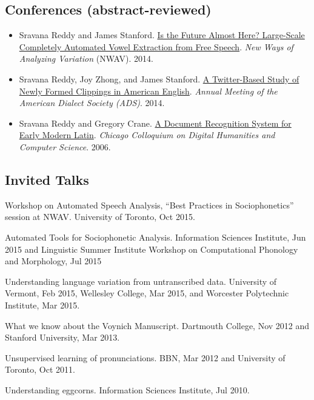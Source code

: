 \documentclass[10.5pt,letterpaper]{article}
\begin{document}
%
%
%

\subsection*{Conferences (abstract-reviewed)}

\begin{itemize}
\item Sravana Reddy and James Stanford. \ul{Is the Future Almost Here? Large-Scale Completely Automated Vowel Extraction from Free Speech}. {\em New Ways of Analyzing Variation} (NWAV). 2014. 

\item Sravana Reddy, Joy Zhong, and James Stanford. \ul{A Twitter-Based Study of Newly Formed Clippings in American English}. {\em Annual Meeting of the American Dialect Society (ADS)}. 2014.

\item Sravana Reddy and Gregory Crane. \ul{A Document Recognition System for Early Modern Latin}. {\em Chicago Colloquium on Digital Humanities and Computer Science}. 2006.

\end{itemize}

\subsection*{Invited Talks}

\begin{itemize*}
\item Workshop on Automated Speech Analysis, ``Best Practices in Sociophonetics'' session at NWAV. University of Toronto, Oct 2015.
\item Automated Tools for Sociophonetic Analysis. Information Sciences Institute, Jun 2015 and Linguistic Summer Institute Workshop on Computational Phonology and Morphology, Jul 2015
\item Understanding language variation from untranscribed data. University of Vermont, Feb 2015, Wellesley College, Mar 2015, and Worcester Polytechnic Institute, Mar 2015.
\item What we know about the Voynich Manuscript. Dartmouth College, Nov 2012 and Stanford University, Mar 2013.
\item Unsupervised learning of pronunciations. BBN, Mar 2012 and University of Toronto, Oct 2011.
\item Understanding eggcorns. Information Sciences Institute, Jul 2010.
\end{itemize*}
\end{document}
